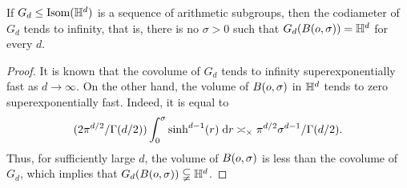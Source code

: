 \begin{proposition}
\label{propositionarithmeticvolume}
If $G_d\leq\Isom(\H^d)$ is a sequence of arithmetic subgroups, then the codiameter of $G_d$ tends to infinity, that is, there is no $\sigma > 0$ such that $G_d(B(\zero,\sigma)) = \H^d$ for every $d$.
\end{proposition}
\begin{proof}
It is known \cite[Corollary 3.3]{Belolipetsky_survey} that the covolume of $G_d$ tends to infinity superexponentially fast as $d\to\infty$.
On the other hand, the volume of $B(o,\sigma)$ in $\H^d$ tends to zero superexponentially fast. Indeed, it is equal to 
\[
(2\pi^{d/2}/\Gamma(d/2))\int_0^\sigma \sinh^{d - 1}(r)\;\mathrm{d} r \asymp_\times \pi^{d/2} \sigma^{d - 1}/\Gamma(d/2).
\] 
Thus, for sufficiently large $d$, the volume of $B(o,\sigma)$ is less than the covolume of $G_d$, which implies that $G_d(B(\zero,\sigma)) \propersubset \H^d$.
\end{proof}

